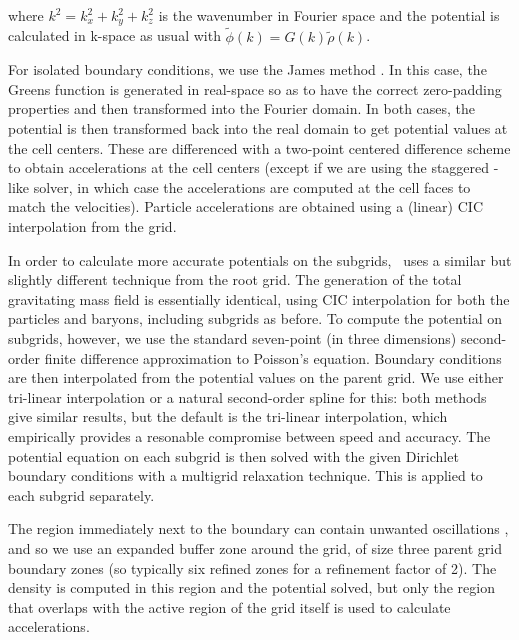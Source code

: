where $k^2 = k_x^2 + k_y^2 + k_z^2$ is the wavenumber in Fourier space
and the potential is calculated in k-space as usual with
$\tilde{\phi}(k) = G(k) \tilde{\rho}(k)$.

For isolated boundary conditions, we use the James method
\citep{James77}.  In this case, the Greens function is generated in
real-space so as to have the correct zero-padding properties and then
transformed into the Fourier domain.  In both cases, the potential is
then transformed back into the real domain to get potential values at
the cell centers.  These are differenced with a two-point centered
difference scheme to obtain accelerations at the cell centers (except
if we are using the staggered \zeus-like solver, in which case the
accelerations are computed at the cell faces to match the velocities).
Particle accelerations are obtained using a (linear) CIC interpolation
from the grid.

In order to calculate more accurate potentials on the subgrids, \enzo\
uses a similar but slightly different technique from the root grid.
The generation of the total gravitating mass field is essentially
identical, using CIC interpolation for both the particles and baryons,
including subgrids as before.  To compute the potential on subgrids,
however, we use the standard seven-point (in three dimensions)
second-order finite difference approximation to Poisson's equation.
Boundary conditions are then interpolated from the potential values on
the parent grid.  We use either tri-linear interpolation or a natural
second-order spline for this: both methods give similar results, but
the default is the tri-linear interpolation, which empirically
provides a resonable compromise between speed and accuracy. The
potential equation on each subgrid is then solved with the given
Dirichlet boundary conditions with a multigrid relaxation technique.
This is applied to each subgrid separately.

The region immediately next to the boundary can contain unwanted
oscillations \citep[e.g.,][]{Anninos94}, and so we use an expanded
buffer zone around the grid, of size three parent grid boundary zones
(so typically six refined zones for a refinement factor of 2).  The
density is computed in this region and the potential solved, but only
the region that overlaps with the active region of the grid itself is
used to calculate accelerations.

